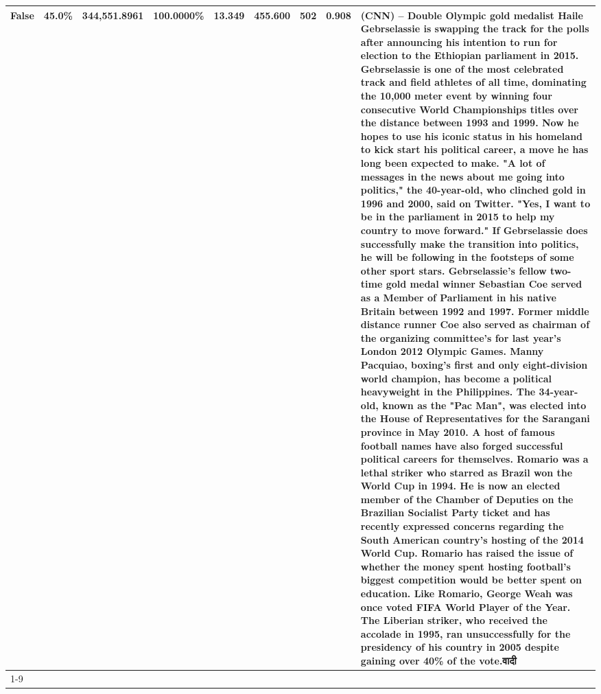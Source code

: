 \begin{table}[H]
{\begin{tabular}{lllrlllll}
False & 45.0\% & 344,551.8961 & \bfseries \color{red} 100.0000\% & 13.349 & 455.600 & 502 & 0.908 & (CNN) -- Double Olympic gold medalist Haile Gebrselassie is swapping the track for the polls after announcing his intention to run for election to the Ethiopian parliament in 2015. Gebrselassie is one of the most celebrated track and field athletes of all time, dominating the 10,000 meter event by winning four consecutive World Championships titles over the distance between 1993 and 1999. Now he hopes to use his iconic status in his homeland to kick start his political career, a move he has long been expected to make. "A lot of messages in the news about me going into politics," the 40-year-old, who clinched gold in 1996 and 2000, said on Twitter. "Yes, I want to be in the parliament in 2015 to help my country to move forward." If Gebrselassie does successfully make the transition into politics, he will be following in the footsteps of some other sport stars. Gebrselassie's fellow two-time gold medal winner Sebastian Coe served as a Member of Parliament in his native Britain between 1992 and 1997. Former middle distance runner Coe also served as chairman of the organizing committee's for last year's London 2012 Olympic Games. Manny Pacquiao, boxing's first and only eight-division world champion, has become a political heavyweight in the Philippines. The 34-year-old, known as the "Pac Man", was elected into the House of Representatives for the Sarangani province in May 2010. A host of famous football names have also forged successful political careers for themselves. Romario was a lethal striker who starred as Brazil won the World Cup in 1994. He is now an elected member of the Chamber of Deputies on the Brazilian Socialist Party ticket and has recently expressed concerns regarding the South American country's hosting of the 2014 World Cup. Romario has raised the issue of whether the money spent hosting football's biggest competition would be better spent on education. Like Romario, George Weah was once voted FIFA World Player of the Year. The Liberian striker, who received the accolade in 1995, ran unsuccessfully for the presidency of his country in 2005 despite gaining over 40\% of the vote.वादी \\
\cline{1-9}

\end{tabular}}
\end{table}

